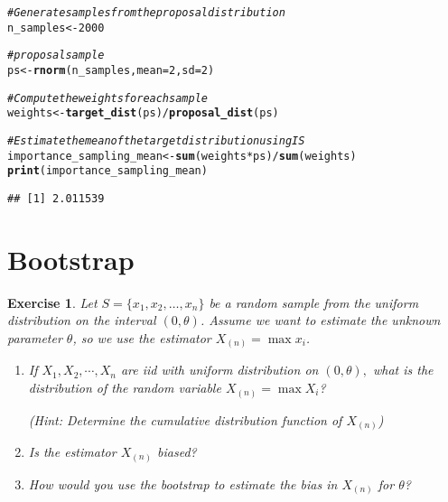 \documentclass{article}\usepackage[]{graphicx}\usepackage[]{xcolor}
\makeatletter
\newcommand{\hlnum}[1]{\textcolor[rgb]{0.686,0.059,0.569}{#1}}%
\newcommand{\hlcom}[1]{\textcolor[rgb]{0.678,0.584,0.686}{\textit{#1}}}%
\newcommand{\hlopt}[1]{\textcolor[rgb]{0,0,0}{#1}}%
\newcommand{\hldef}[1]{\textcolor[rgb]{0.345,0.345,0.345}{#1}}%
\newcommand{\hlkwb}[1]{\textcolor[rgb]{0.69,0.353,0.396}{#1}}%
\newcommand{\hlkwc}[1]{\textcolor[rgb]{0.333,0.667,0.333}{#1}}%
\newcommand{\hlkwd}[1]{\textcolor[rgb]{0.737,0.353,0.396}{\textbf{#1}}}%
\newenvironment{kframe}{%
 \def\at@end@of@kframe{}%
 \ifinner\ifhmode%
  \def\at@end@of@kframe{\end{minipage}}%
  \begin{minipage}{\columnwidth}%
 \fi\fi%
 \def\FrameCommand##1{\hskip\@totalleftmargin \hskip-\fboxsep
 \colorbox{shadecolor}{##1}\hskip-\fboxsep
     \hskip-\linewidth \hskip-\@totalleftmargin \hskip\columnwidth}%
 \MakeFramed {\advance\hsize-\width
   \@totalleftmargin\z@ \linewidth\hsize
   \@setminipage}}%
 {\par\unskip\endMakeFramed%
 \at@end@of@kframe}
\newenvironment{knitrout}{}{} %
\newtheorem{exercise}{Exercise}
\makeatother
\begin{document}
\begin{knitrout}
\color{fgcolor}\begin{kframe}
\begin{alltt}
\hlcom{# Generate samples from the proposal distribution }
\hldef{n_samples} \hlkwb{<-} \hlnum{2000}

\hlcom{# proposal sample}
\hldef{ps} \hlkwb{<-} \hlkwd{rnorm}\hldef{(n_samples,} \hlkwc{mean} \hldef{=} \hlnum{2}\hldef{,} \hlkwc{sd} \hldef{=} \hlnum{2}\hldef{)}

\hlcom{# Compute the weights for each sample}
\hldef{weights} \hlkwb{<-} \hlkwd{target_dist}\hldef{(ps)} \hlopt{/} \hlkwd{proposal_dist}\hldef{(ps)}

\hlcom{# Estimate the mean of the target distribution using IS}
\hldef{importance_sampling_mean} \hlkwb{<-} \hlkwd{sum}\hldef{(weights} \hlopt{*} \hldef{ps)} \hlopt{/} \hlkwd{sum}\hldef{(weights)}
\hlkwd{print}\hldef{(importance_sampling_mean)}
\end{alltt}
\begin{verbatim}
## [1] 2.011539
\end{verbatim}
\end{kframe}
\end{knitrout}

\section{Bootstrap}

\begin{exercise}
Let $S = \lbrace x_1, x_2, \ldots, x_n \rbrace$ be a random sample from the uniform distribution on the interval $(0, \theta)$. Assume we want to estimate the unknown parameter $\theta$, so we use the estimator $X_{(n)} = \max x_i$.

\begin{enumerate}
\item If $X_1,X_2,\cdots, X_n$ are iid with uniform distribution on $(0,\theta),$ what is the distribution of the random variable $X_{(n)} = \max X_i$? 

(Hint: Determine the cumulative distribution function of $X_{(n)}$)

\item Is the estimator $X_{(n)}$ biased?

\item How would you use the bootstrap to estimate the bias in $X_{(n)}$ for $\theta$?
\end{enumerate}

\end{exercise}
\end{document}
